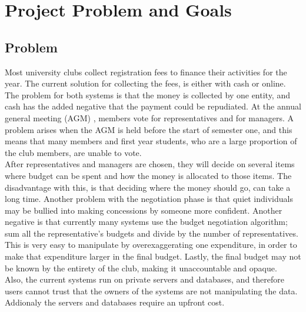 \chapter{Project Problem and Goals} \label{Chapter: Project Problem and Goals}
\section{Problem}
Most university clubs collect registration fees to finance their activities for the year. The current solution for collecting the fees, is either with cash or online. The problem for both systems is that the money is collected by one entity, and cash has the added negative that the payment could be repudiated. At the annual general meeting  (AGM) , members vote for representatives and for managers. A problem arises when the AGM is held before the start of semester one, and this means that many members and first year students, who are a large proportion of the club members, are unable to vote. \\
After representatives and managers are chosen, they will decide on several items where budget can be spent and how the money is allocated to those items. The disadvantage with this, is that deciding where the money should go, can take a long time. Another problem with the negotiation phase is that quiet individuals may be bullied into making concessions by someone more confident. Another negative is that currently many systems use the budget negotiation algorithm; sum all the representative’s budgets and divide by the number of representatives. This is very easy to manipulate by overexaggerating one expenditure, in order to make that expenditure larger in the final budget. Lastly, the final budget may not be known by the entirety of the club, making it unaccountable and opaque. \\
Also, the current systems run on private servers and databases, and therefore users cannot trust that the owners of the systems are not manipulating the data. Addionaly the servers and databases require an upfront cost.
